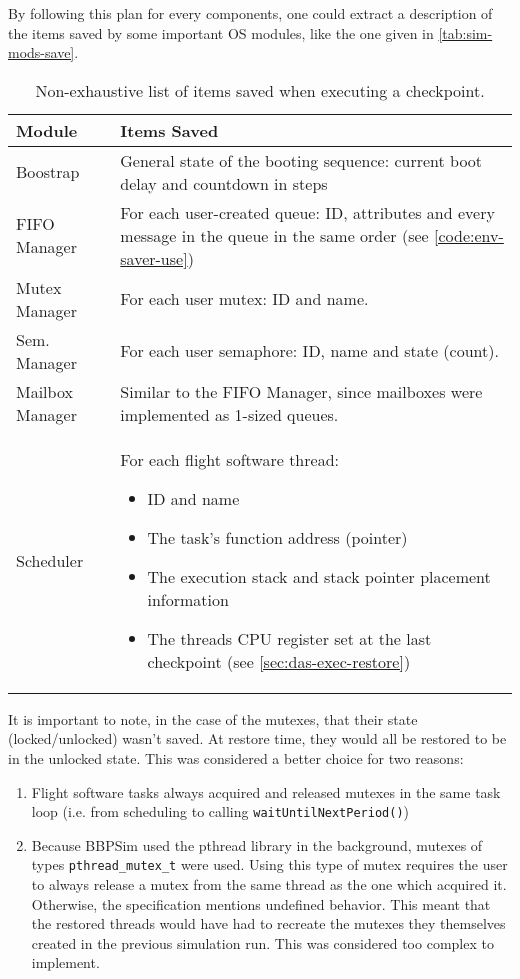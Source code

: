 {By following this plan for every components, one could extract a description of the items saved by some important OS modules, like the one given in  \autoref{tab:sim-mods-save}. 

\begin{table}[htbp]
	\centering
	\begin{tabularx}{\linewidth}{l X}
		\toprule
		\textbf{Module} & \textbf{Items Saved}\\
		\midrule
		Boostrap & {General state of the booting sequence: current boot delay and countdown in steps}\\
		\midrule
		FIFO Manager & {For each user-created queue: ID, attributes and every message in the queue in the same order (see \autoref{code:env-saver-use})}\\
		\midrule
		Mutex Manager & {For each user mutex: ID and name.}\\
		\midrule
		Sem. Manager & {For each user semaphore: ID, name and state (count).}\\	
		\midrule
		Mailbox Manager & {Similar to the FIFO Manager, since mailboxes were implemented as 1-sized queues.}\\
		\midrule
		Scheduler & {For each flight software thread:
		\vspace{-6pt}
		\begin{itemize}\setlength\itemsep{0em}
			\item ID and name
			\item The task's function address (pointer)
			\item The execution stack and stack pointer placement information
			\item The threads CPU register set at the last checkpoint (see \autoref{sec:das-exec-restore})
		\end{itemize}	
		}\\
		\bottomrule
	\end{tabularx}
	\caption{Non-exhaustive list of items saved when executing a checkpoint.}
	\label{tab:sim-mods-save}
\end{table}

It is important to note, in the case of the mutexes, that their state (locked/unlocked) wasn't saved. At restore time, they would all be restored to be in the unlocked state. This was considered a better choice for two reasons: 
\begin{enumerate}
	\item Flight software tasks always acquired and released mutexes in the same task loop (i.e. from scheduling to calling \texttt{waitUntilNextPeriod()})
	\item Because \gls{BBPSim} used the pthread library in the background, mutexes of types \texttt{pthread_mutex_t} were used. Using this type of mutex requires the user to always release a mutex from the same thread as the one which acquired it. Otherwise, the specification mentions undefined behavior\cite{online:pthread-mutex}. This meant that the restored threads would have had to recreate the mutexes they themselves created in the previous simulation run. This was considered too complex to implement.
\end{enumerate}

}
